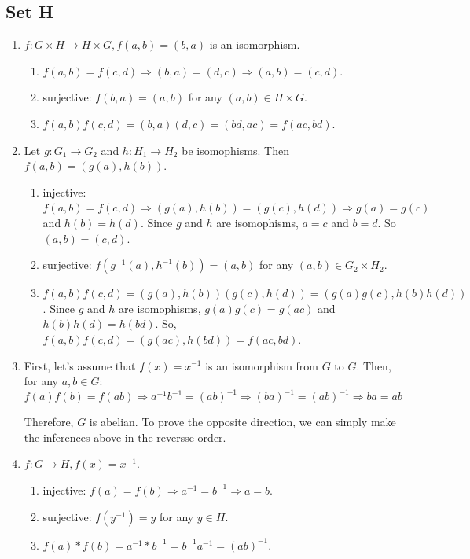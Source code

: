 \documentclass{article}
\begin{document}
\subsection{Set H}
\begin{enumerate}
    \item $ f: G \times H \to H \times G, f(a, b) = (b, a) $ is an isomorphism.
        \begin{enumerate}
            \item $ f(a, b) = f(c, d) \Rightarrow (b, a) = (d, c) \Rightarrow (a, b) = (c, d) $.

            \item surjective: $ f(b, a) = (a, b) $ for any $ (a, b) \in H \times G $.

            \item $ f(a, b)f(c, d) = (b, a)(d, c) = (bd, ac) = f(ac, bd) $.
        \end{enumerate}
    
    \item Let $ g: G_1 \to G_2 $ and $ h: H_1 \to H_2$ be isomophisms. Then $ f(a, b) = (g(a), h(b)) $.
        \begin{enumerate}
            \item injective: $ f(a, b) = f(c, d) \Rightarrow (g(a), h(b)) = (g(c), h(d)) \Rightarrow g(a) = g(c) $  and $ h(b) = h(d) $. Since $ g $ and $ h $ are isomophisms, $ a = c $ and $  b = d $. So $ (a, b) = (c, d) $.

            \item surjective: $ f(g^{-1}(a), h^{-1}(b)) = (a, b) $ for any $ (a, b) \in G _2 \times H_2 $.

            \item $ f(a, b)f(c, d) = (g(a), h(b))(g(c), h(d)) = (g(a)g(c), h(b)h(d)) $. Since $ g $ and $ h $ are isomophisms, $ g(a)g(c) = g(ac) $ and $ h(b)h(d) = h(bd) $. So, $ f(a, b)f(c, d) = (g(ac), h(bd)) = f(ac, bd) $.
        \end{enumerate}

    \item First, let's assume that $ f(x) = x^{-1} $ is an isomorphism from $ G $ to $ G $. Then, for any $ a, b \in G $:
    $$
        f(a)f(b) = f(ab) \Rightarrow a^{-1}b^{-1} = (ab)^{-1} \Rightarrow (ba)^{-1} = (ab)^{-1} \Rightarrow ba = ab
    $$

    Therefore, $ G $ is abelian. To prove the opposite direction, we can simply make the inferences above in the reversse order.

    \item $ f: G \to H, f(x) = x^{-1} $.
        \begin{enumerate}
            \item injective: $ f(a) = f(b) \Rightarrow a^{-1} = b^{-1} \Rightarrow a = b $.

            \item surjective: $ f(y^{-1}) = y $ for any $ y \in H $.

            \item $ f(a) * f(b) =a^{-1} * b^{-1} = b^{-1}a^{-1} = (ab)^{-1} $.
        \end{enumerate}
\end{enumerate}
    
\end{document}

